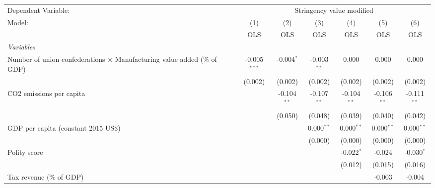 
\begingroup
\centering
\begin{tabular}{lcccccc}
   \toprule
   Dependent Variable: & \multicolumn{6}{c}{Stringency value modified}\\
   Model:                                                                          & (1)            & (2)           & (3)           & (4)           & (5)           & (6)\\  
                                                                                   &  OLS           & OLS           & OLS           & OLS           & OLS           & OLS\\  
   \midrule
   \emph{Variables}\\
   Number of union confederations $\times$ Manufacturing value added (\% of GDP)   & -0.005$^{***}$ & -0.004$^{*}$  & -0.003$^{**}$ & 0.000         & 0.000         & 0.000\\   
                                                                                   & (0.002)        & (0.002)       & (0.002)       & (0.002)       & (0.002)       & (0.002)\\   
   CO2 emissions per capita                                                        &                & -0.104$^{**}$ & -0.107$^{**}$ & -0.104$^{**}$ & -0.106$^{**}$ & -0.111$^{**}$\\   
                                                                                   &                & (0.050)       & (0.048)       & (0.039)       & (0.040)       & (0.042)\\   
   GDP per capita (constant 2015 US\$)                                             &                &               & 0.000$^{**}$  & 0.000$^{**}$  & 0.000$^{**}$  & 0.000$^{**}$\\   
                                                                                   &                &               & (0.000)       & (0.000)       & (0.000)       & (0.000)\\   
   Polity score                                                                    &                &               &               & -0.022$^{*}$  & -0.024        & -0.030$^{*}$\\   
                                                                                   &                &               &               & (0.012)       & (0.015)       & (0.016)\\   
   Tax revenue (\% of GDP)                                                         &                &               &               &               & -0.003        & -0.004\\   

\end{tabular}
